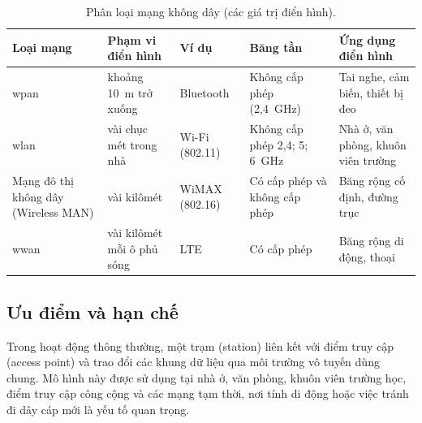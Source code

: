 \begin{table}[htbp]
  \centering\footnotesize
  \caption{Phân loại mạng không dây (các giá trị điển hình).}
  \label{tab:wireless-classes}
  \begin{tabularx}{\linewidth}{@{} L{0.8} L{0.9} L{0.9} L{1.2} L{1.2} @{}}
    \toprule
    \textbf{Loại mạng} & \textbf{Phạm vi điển hình} & \textbf{Ví dụ} & \textbf{Băng tần} & \textbf{Ứng dụng điển hình} \\
    \midrule
    \ac{wpan}      & khoảng 10~m trở xuống   & Bluetooth         & Không cấp phép (2,4~GHz) & Tai nghe, cảm biến, thiết bị đeo \\
    \acs{wlan}     & vài chục mét trong nhà  & Wi-Fi (802.11)    & Không cấp phép 2,4; 5; 6~GHz & Nhà ở, văn phòng, khuôn viên trường \\
    Mạng đô thị không dây (Wireless MAN) & vài kilômét & WiMAX (802.16) & Có cấp phép và không cấp phép & Băng rộng cố định, đường trục \\
    \ac{wwan}      & vài kilômét mỗi ô phủ sóng & LTE            & Có cấp phép              & Băng rộng di động, thoại \\
    \bottomrule
  \end{tabularx}
\end{table}

\subsection{Ưu điểm và hạn chế}

Trong hoạt động thông thường, một trạm (station) liên kết với điểm truy cập
(access point) và trao đổi các khung dữ liệu qua môi trường vô tuyến dùng chung.
Mô hình này được sử dụng tại nhà ở, văn phòng, khuôn viên trường học, điểm
truy cập công cộng và các mạng tạm thời, nơi tính di động hoặc việc tránh đi
dây cáp mới là yếu tố quan trọng.

